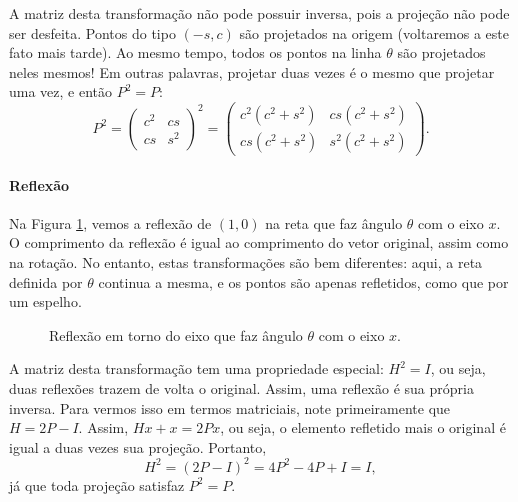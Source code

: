 A matriz desta transformação não pode possuir inversa, pois a projeção não pode ser desfeita. Pontos do tipo $(-s,c)$ são projetados na origem (voltaremos a este fato mais tarde). Ao mesmo tempo, todos os pontos na linha $\theta$ são projetados neles mesmos! Em outras palavras, projetar duas vezes é o mesmo que projetar uma vez, e então $P^2=P$:
\begin{equation*}
  P^2=
  \begin{pmatrix}
     c^2 & cs\\
     cs & s^2
  \end{pmatrix}
  ^2 = 
  \begin{pmatrix}
     c^2(c^2+s^2) & cs(c^2+s^2)\\
     cs(c^2+s^2) & s^2(c^2+s^2)
  \end{pmatrix}.
\end{equation*}

\paragraph*{Reflexão} Na Figura \ref{fig:reflexao}, vemos a reflexão de $(1,0)$ na reta que faz ângulo $\theta$ com o eixo $x$. O comprimento da reflexão é igual ao comprimento do vetor original, assim como na rotação. No entanto, estas transformações são bem diferentes: aqui, a reta definida por $\theta$ continua a mesma, e os pontos são apenas refletidos, como que por um espelho. 
\begin{figure}[!h]
  \centering
  \caption{Reflexão em torno do eixo que faz ângulo $\theta$ com o eixo $x$.}
  \label{fig:reflexao}
\end{figure}

A matriz desta transformação tem uma propriedade especial: $H^2=I$, ou seja, duas reflexões trazem de volta o original. Assim, uma reflexão é sua própria inversa. Para vermos isso em termos matriciais, note primeiramente que $H=2P-I$. Assim, $Hx+x=2Px$, ou seja, o elemento refletido mais o original é igual a duas vezes sua projeção. Portanto,
\begin{equation*}
  H^2 = (2P-I)^2 = 4P^2-4P+I=I,
\end{equation*}
já que toda projeção satisfaz $P^2=P$.

